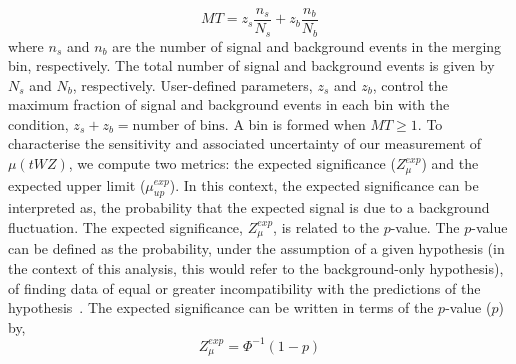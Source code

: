 \begin{equation}
MT =  z_{s} \frac{n_{s}}{N_{s}} + z_{b} \frac{n_{b}}{N_{b}} 
\end{equation}
where $n_{s}$ and $n_{b}$ are the number of signal and background events in the merging bin, respectively. The total number of signal and background events is given by $N_{s}$ and $N_{b}$, respectively. User-defined parameters, $z_{s}$ and $z_{b}$, control the maximum fraction of signal and background events in each bin with the condition, $z_{s} + z_{b} = \text{number of bins}$. A bin is formed when $MT \geq 1$. To characterise the sensitivity and associated uncertainty of our measurement of $\mu (tWZ)$, we compute two metrics: the expected significance ($Z_{\mu}^{exp}$) and the expected upper limit ($\mu_{up}^{exp}$). In this context, the expected significance can be interpreted as, the probability that the expected signal is due to a background fluctuation. The expected significance, $Z_{\mu}^{exp}$, is related to the $p$-value. The $p$-value can be defined as the probability, under the assumption of a given hypothesis (in the context of this analysis, this would refer to the background-only hypothesis), of finding data of equal or greater incompatibility with the predictions of the hypothesis~\cite{Cowan_2011}. The expected significance can be written in terms of the $p$-value ($p$) by,
\begin{equation}
 Z_{\mu}^{exp} = \Phi^{-1} (1-p)
\end{equation}
